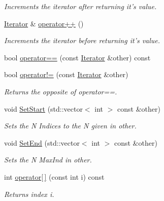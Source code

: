 \begin{DoxyCompactItemize}
\begin{DoxyCompactList}\small\item\em Increments the iterator after returning it's value. \item\end{DoxyCompactList}\item 
\hyperlink{classJKBuilder_1_1Iterator}{Iterator} \& \hyperlink{classJKBuilder_1_1Iterator_ae1f21c74128a5ef5d1b9de72ceb09be8}{operator++} ()
\begin{DoxyCompactList}\small\item\em Increments the iterator before returning it's value. \item\end{DoxyCompactList}\item 
bool \hyperlink{classJKBuilder_1_1Iterator_a1ea001976a5bc8ae8dc365e2a912b59a}{operator==} (const \hyperlink{classJKBuilder_1_1Iterator}{Iterator} \&other) const 
\item 
bool \hyperlink{classJKBuilder_1_1Iterator_a8c06af8ae0d9d1614ae9f81629275926}{operator!=} (const \hyperlink{classJKBuilder_1_1Iterator}{Iterator} \&other)
\begin{DoxyCompactList}\small\item\em Returns the opposite of operator==. \item\end{DoxyCompactList}\item 
void \hyperlink{classJKBuilder_1_1Iterator_aa83de505e29125c1d3ac7bb1b13ca15a}{SetStart} (std::vector$<$ int $>$ const \&other)
\begin{DoxyCompactList}\small\item\em Sets the N Indices to the N given in other. \item\end{DoxyCompactList}\item 
void \hyperlink{classJKBuilder_1_1Iterator_aad84ec668b5f41210db34c540aaa31fc}{SetEnd} (std::vector$<$ int $>$ const \&other)
\begin{DoxyCompactList}\small\item\em Sets the N MaxInd in other. \item\end{DoxyCompactList}\item 
int \hyperlink{classJKBuilder_1_1Iterator_a74247cf730a06b23fcb1ec64e5596b25}{operator\mbox{[}$\,$\mbox{]}} (const int i) const 
\begin{DoxyCompactList}\small\item\em Returns index i. \item\end{DoxyCompactList}\end{DoxyCompactItemize}
